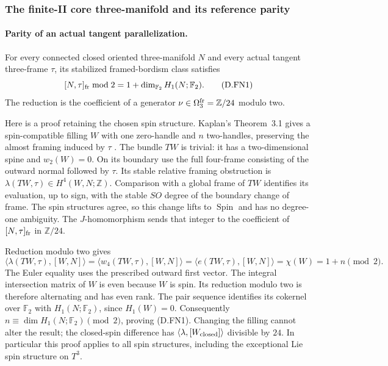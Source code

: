 \subsubsection*{The finite-II core three-manifold and its reference parity}

\paragraph{Parity of an actual tangent parallelization.}
For every connected closed oriented three-manifold $N$ and every
actual tangent three-frame $\tau$, its stabilized framed-bordism
class satisfies
\[
 [N,\tau]_{\rm fr}\bmod2
                  =1+\dim_{\mathbb F_2}H_1(N;\mathbb F_2).
 \tag{D.FN1}
\]
The reduction is the coefficient of a generator
$\nu\in\Omega^{\rm fr}_3=\mathbb Z/24$ modulo two.

Here is a proof retaining the chosen spin structure.  Kaplan's
Theorem~3.1 gives a spin-compatible filling $W$ with one zero-handle
and $n$ two-handles, preserving the almost framing induced by
$\tau$ \cite[Definition 1.7, Remark 1.8, and pp.243--246]{mapsKaplan79}.
The bundle $TW$ is trivial: it has a two-dimensional spine and
$w_2(W)=0$.  On its boundary use the full four-frame consisting
of the outward normal followed by $\tau$.  Its stable relative
framing obstruction is
$\lambda(TW,\tau)\in H^4(W,N;\mathbb Z)$.
Comparison with a global frame of $TW$ identifies its evaluation,
up to sign, with the stable $SO$ degree of the boundary change of
frame.  The spin structures agree, so this change lifts to
$\operatorname{Spin}$ and has no degree-one ambiguity.
The $J$-homomorphism sends that integer to the coefficient of
$[N,\tau]_{\rm fr}$ in $\mathbb Z/24$.

Reduction modulo two gives
\[
 \langle\lambda(TW,\tau),[W,N]\rangle
 =\langle w_4(TW,\tau),[W,N]\rangle
 =\langle e(TW,\tau),[W,N]\rangle
 =\chi(W)=1+n\pmod2.
 \tag{D.FN2}
\]
The Euler equality uses the prescribed outward first vector.
The integral intersection matrix of $W$ is even because $W$ is
spin.  Its reduction modulo two is therefore alternating and
has even rank.  The pair sequence identifies its cokernel over
$\mathbb F_2$ with $H_1(N;\mathbb F_2)$, since $H_1(W)=0$.
Consequently $n\equiv\dim H_1(N;\mathbb F_2)\pmod2$, proving
(D.FN1).  Changing the filling cannot alter the result; the
closed-spin difference has $\langle\lambda,[W_{\rm closed}]\rangle$
divisible by $24$.  In particular this proof applies to all spin
structures, including the exceptional Lie spin structure on
$T^3$.

